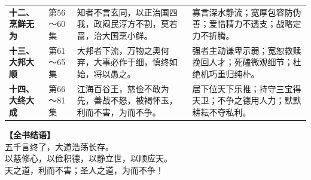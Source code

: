 \begin{center}
\begin{longtable}{p{2.2cm} p{2.8cm} p{5cm} p{4.2cm}}
\addlinespace
\textbf{十二、烹鲜无为} & 第56～60集 & 知者不言玄同，以正治国四我，政闷民淳方不割，莫若啬，治大国烹小鲜。 & 寡言深水静流；宽厚包容防伪善；爱惜精力不透支；战略定力不折腾。 \\
\addlinespace
\textbf{十三、大邦大顺} & 第61～65集 & 大邦者下流，万物之奥何弃，大事必作于细，慎终如始，将以愚之。 & 强者主动谦卑示弱；宽恕救赎挽回人才；死磕微观细节；杜绝机巧重归纯朴。 \\
\addlinespace
\textbf{十四、大终大成} & 第66～81集 & 江海百谷王，慈俭不敢为先，善战不怒，被褐怀玉，利而不害，为而不争。 & 居下位天下乐推；持守三宝得天卫；不争之德用人力；默默耕耘不夺私利。 \\
\bottomrule
\end{longtable}
\end{center}

\vspace{1em}
\begin{center}
\textbf{【全书结语】}\\
\kaishu
五千言终了，大道浩荡长存。\\
以慈修心，以俭积德，以静立世，以顺应天。\\
天之道，利而不害；圣人之道，为而不争！
\end{center}